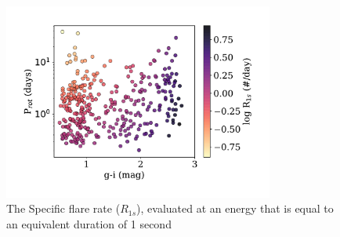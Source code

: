 \documentclass[preprint2]{aastex62}
\begin{document}
\begin{figure}[!ht]
\centering
\includegraphics[width=3.5in]{fig6}
\caption{
The Specific flare rate ($R_{1s}$), evaluated at an energy that is equal to an equivalent duration of 1 second
}
\label{fig:R1s}
\end{figure}
\end{document}

